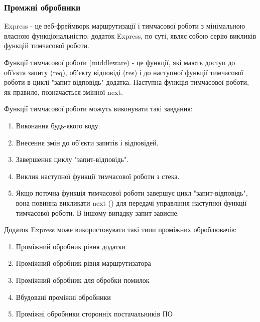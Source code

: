 \subsubsection{Промжні обробники} \label{subs:middleware}

Express - це веб-фреймворк маршрутизації і тимчасової роботи з мінімальною власною функціональністю: додаток Express, по суті, являє собою серію викликів функцій тимчасової роботи.

Функції тимчасової роботи (middleware) - це функції, які мають доступ до об'єкта запиту (req), об'єкту відповіді (res) і до наступної функції тимчасової роботи в циклі "запит-відповідь" додатка. Наступна функція тимчасової роботи, як правило, позначається змінної next.

Функції тимчасової роботи можуть виконувати такі завдання:

\begin{enumerate}
	\item Виконання будь-якого коду.
	\item Внесення змін до об'єкти запитів і відповідей.
	\item Завершення циклу "запит-відповідь".
	\item Виклик наступної функції тимчасової роботи з стека.
	\item Якщо поточна функція тимчасової роботи завершує цикл "запит-відповідь", вона повинна викликати next () для передачі управління наступної функції тимчасової роботи. В іншому випадку запит зависне.
\end{enumerate}	

Додаток Express може використовувати такі типи проміжних оброблювачів:

\begin{enumerate}
	\item Проміжний обробник рівня додатки
	\item Проміжний обробник рівня маршрутизатора
	\item Проміжний обробник для обробки помилок
	\item Вбудовані проміжні обробники
	\item Проміжні обробники сторонніх постачальників ПО
\end{enumerate}	
